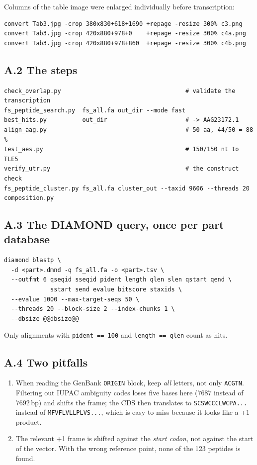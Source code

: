 \documentclass[11pt,a4paper]{article}
\begin{document}
Columns of the table image were enlarged individually before transcription:

\begin{lstlisting}
convert Tab3.jpg -crop 380x830+618+1690 +repage -resize 300% c3.png
convert Tab3.jpg -crop 420x880+978+0    +repage -resize 300% c4a.png
convert Tab3.jpg -crop 420x880+978+860  +repage -resize 300% c4b.png
\end{lstlisting}

\subsection*{A.2 The steps}

\begin{lstlisting}
check_overlap.py                                   # validate the transcription
fs_peptide_search.py  fs_all.fa out_dir --mode fast
best_hits.py          out_dir                      # -> AAG23172.1
align_aag.py                                       # 50 aa, 44/50 = 88 %
test_aes.py                                        # 150/150 nt to TLE5
verify_utr.py                                      # the construct check
fs_peptide_cluster.py fs_all.fa cluster_out --taxid 9606 --threads 20
composition.py
\end{lstlisting}

\subsection*{A.3 The DIAMOND query, once per part database}

\begin{lstlisting}
diamond blastp \
  -d <part>.dmnd -q fs_all.fa -o <part>.tsv \
  --outfmt 6 qseqid sseqid pident length qlen slen qstart qend \
             sstart send evalue bitscore staxids \
  --evalue 1000 --max-target-seqs 50 \
  --threads 20 --block-size 2 --index-chunks 1 \
  --dbsize @@dbsize@@
\end{lstlisting}

Only alignments with \texttt{pident == 100} and \texttt{length == qlen} count
as hits.

\subsection*{A.4 Two pitfalls}

\begin{enumerate}
\item When reading the GenBank \texttt{ORIGIN} block, keep \emph{all} letters,
      not only \texttt{ACGTN}. Filtering out IUPAC ambiguity codes loses five
      bases here (7687 instead of 7692\,bp) and shifts the frame; the CDS then
      translates to \texttt{SCSWCCCLWCPA...} instead of
      \texttt{MFVFLVLLPLVS...}, which is easy to miss because it looks like a
      +1 product.
\item The relevant +1 frame is shifted against the \emph{start codon}, not
      against the start of the vector. With the wrong reference point, none of
      the 123 peptides is found.
\end{enumerate}
\end{document}
